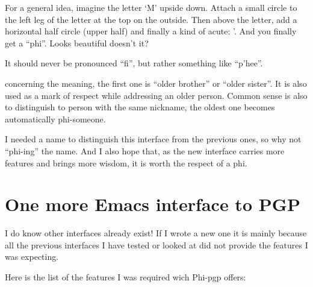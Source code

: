 For a general idea, imagine the letter `M' upside down. Attach a small
circle to the left leg  of the letter at  the top on the outside. Then
above  the   letter, add a   horizontal half  circle  (upper half) and
finally a kind   of acute: '.  And  you finally  get a  ``phi''. Looks
beautiful doesn't it?

It  should never  be  pronounced  ``fi'',  but  rather  something  like
``p'hee''.

concerning the meaning, the first  one is ``older brother'' or ``older
sister''. It is  also used as  a mark of  respect while  addressing an
older person.  Common sense is also  to distinguish to person with the
same nickname, the oldest one becomes automatically phi-someone.

I needed a name to distinguish this interface  from the previous ones,
so why  not ``phi-ing'' the  name.  And I also hope   that, as the new
interface carries more features and brings more wisdom, it is worth the
respect of a phi.

\section{One more Emacs interface to PGP}

I do know other interfaces already exist!  If I wrote a  new one it is
mainly because all the previous interfaces I have  tested or looked at
did not provide the features I was expecting.

Here is the list of the features I was required wich Phi-pgp offers:

